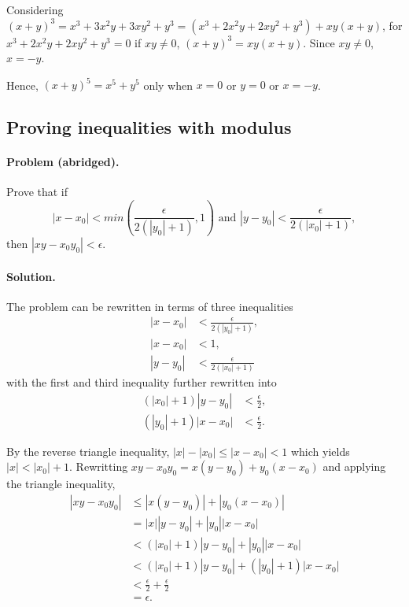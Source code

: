 \documentclass{article}
\begin{document}
Considering $(x + y)^3 = x^3 + 3x^2y + 3xy^2 + y^3 = (x^3 + 2x^2y + 2xy^2 + y^3) + xy(x + y)$, for $x^3 + 2x^2y + 2xy^2 + y^3 = 0$ if $xy \neq 0$, $(x + y)^3 = xy(x + y)$. Since $xy \neq 0$, $x = -y$.

Hence, $(x + y)^5 = x^5 + y^5$ only when $x = 0$ or $y = 0$ or $x = -y$.

\setcounter{subsection}{20}
\subsection{Proving inequalities with modulus}

\paragraph{Problem (abridged).} Prove that if \begin{equation*}
  |x - x_0| < min\left(\frac{\epsilon}{2(|y_0| + 1)}, 1\right) \text{ and } |y - y_0| < \frac{\epsilon}{2(|x_0| + 1)},
\end{equation*} then $|xy - x_0y_0| < \epsilon$.

\paragraph{Solution.} The problem can be rewritten in terms of three inequalities \begin{align*}
  |x - x_0| &< \frac{\epsilon}{2(|y_0| + 1)}, \\
  |x - x_0| &< 1, \\
  |y - y_0| &< \frac{\epsilon}{2(|x_0| + 1)}
\end{align*} with the first and third inequality further rewritten into \begin{align*}
  (|x_0| + 1)|y - y_0| &< \frac{\epsilon}{2}, \\
  (|y_0| + 1)|x - x_0| &< \frac{\epsilon}{2}.
\end{align*}

By the reverse triangle inequality, $|x| - |x_0| \leq |x - x_0| < 1$ which yields $|x| < |x_0| + 1$. Rewritting $xy - x_0y_0 = x(y - y_0) + y_0(x - x_0)$ and applying the triangle inequality, \begin{align*}
  |xy - x_0y_0| &\leq |x(y - y_0)| + |y_0(x - x_0)| \\
                &= |x||y - y_0| + |y_0||x - x_0| \\
                &< (|x_0| + 1)|y - y_0| + |y_0||x - x_0| \\
                &< (|x_0| + 1)|y - y_0| + (|y_0| + 1)|x - x_0| \\
                &< \frac{\epsilon}{2} + \frac{\epsilon}{2} \\
                &= \epsilon.
\end{align*}
\end{document}
